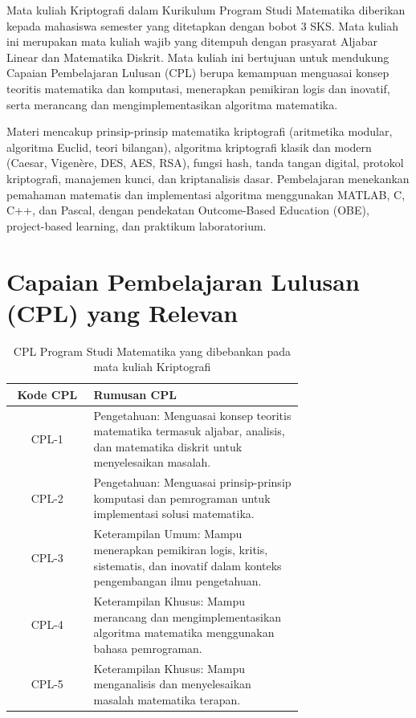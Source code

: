 \documentclass[12pt,a4paper]{article}
\begin{document}
Mata kuliah Kriptografi dalam Kurikulum Program Studi Matematika diberikan kepada mahasiswa semester yang ditetapkan dengan bobot 3 SKS. Mata kuliah ini merupakan mata kuliah wajib yang ditempuh dengan prasyarat Aljabar Linear dan Matematika Diskrit. Mata kuliah ini bertujuan untuk mendukung Capaian Pembelajaran Lulusan (CPL) berupa kemampuan menguasai konsep teoritis matematika dan komputasi, menerapkan pemikiran logis dan inovatif, serta merancang dan mengimplementasikan algoritma matematika.

Materi mencakup prinsip-prinsip matematika kriptografi (aritmetika modular, algoritma Euclid, teori bilangan), algoritma kriptografi klasik dan modern (Caesar, Vigenère, DES, AES, RSA), fungsi hash, tanda tangan digital, protokol kriptografi, manajemen kunci, dan kriptanalisis dasar. Pembelajaran menekankan pemahaman matematis dan implementasi algoritma menggunakan MATLAB, C, C++, dan Pascal, dengan pendekatan Outcome-Based Education (OBE), project-based learning, dan praktikum laboratorium.

\section{Capaian Pembelajaran Lulusan (CPL) yang Relevan}

\begin{table}[!htbp]
\centering
\small
\begin{tabular}{|c|>{\raggedright\arraybackslash}p{0.72\linewidth}|}
\hline
\textbf{Kode CPL} & \textbf{Rumusan CPL} \\
\hline
CPL-1 & Pengetahuan: Menguasai konsep teoritis matematika termasuk aljabar, analisis, dan matematika diskrit untuk menyelesaikan masalah. \\
\hline
CPL-2 & Pengetahuan: Menguasai prinsip-prinsip komputasi dan pemrograman untuk implementasi solusi matematika. \\
\hline
CPL-3 & Keterampilan Umum: Mampu menerapkan pemikiran logis, kritis, sistematis, dan inovatif dalam konteks pengembangan ilmu pengetahuan. \\
\hline
CPL-4 & Keterampilan Khusus: Mampu merancang dan mengimplementasikan algoritma matematika menggunakan bahasa pemrograman. \\
\hline
CPL-5 & Keterampilan Khusus: Mampu menganalisis dan menyelesaikan masalah matematika terapan. \\
\hline
\end{tabular}
\caption{CPL Program Studi Matematika yang dibebankan pada mata kuliah Kriptografi}
\end{table}
\end{document}
